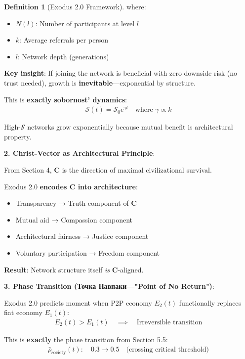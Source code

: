 \documentclass[11pt,a4paper]{article}
\theoremstyle{definition}
\newtheorem{definition}{Definition}[section]
\theoremstyle{remark}
\begin{document}
\begin{enumerate}
\begin{definition}[Exodus 2.0 Framework]
where:
\begin{itemize}
    \item \(N(l)\): Number of participants at level \(l\)
    \item \(k\): Average referrals per person
    \item \(l\): Network depth (generations)
\end{itemize}

\textbf{Key insight}: If joining the network is beneficial with zero downside risk (no trust needed), growth is \textbf{inevitable}—exponential by structure.

This is \textbf{exactly sobornost' dynamics}:
\begin{align}
\mathcal{S}(t) = \mathcal{S}_0 e^{\gamma t} \quad \text{where } \gamma \propto k
\end{align}

High-\(\mathcal{S}\) networks grow exponentially because mutual benefit is architectural property.

\textbf{2. Christ-Vector as Architectural Principle}:

From Section 4, \(\mathbf{C}\) is the direction of maximal civilizational survival.

Exodus 2.0 \textbf{encodes \(\mathbf{C}\) into architecture}:
\begin{itemize}
    \item Transparency → Truth component of \(\mathbf{C}\)
    \item Mutual aid → Compassion component
    \item Architectural fairness → Justice component
    \item Voluntary participation → Freedom component
\end{itemize}

\textbf{Result}: Network structure itself \textit{is} \(\mathbf{C}\)-aligned.

\textbf{3. Phase Transition (Точка Навпаки—"Point of No Return")}:

Exodus 2.0 predicts moment when P2P economy \(E_2(t)\) functionally replaces fiat economy \(E_1(t)\):
\begin{align}
E_2(t) > E_1(t) \quad \implies \quad \text{Irreversible transition}
\end{align}

This is \textbf{exactly} the phase transition from Section 5.5:
\begin{align}
\bar{\rho}_{\text{society}}(t) : \quad 0.3 \to 0.5 \quad \text{(crossing critical threshold)}
\end{align}


\end{definition}
\end{enumerate}
\end{document}
